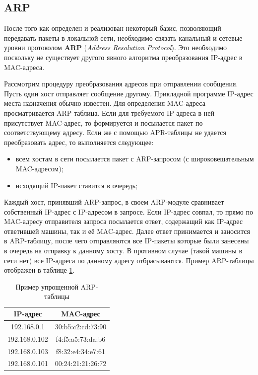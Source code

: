 {\small{}}

\subsection{ARP}

После того как определен и реализован некоторый базис, позволяющий передавать пакеты в локальной сети, необходимо связать канальный и сетевые уровни протоколом \textbf{ARP} (\textit{Address Resolution Protocol})\cite{arp}. Это необходимо поскольку не существует другого явного алгоритма преобразования IP-адрес в MAC-адреса\cite{arpcitforum}.

Рассмотрим процедуру преобразования адресов при отправлении сообщения. Пусть один хост отправляет сообщение другому. Прикладной программе IP-адрес места назначения обычно известен. Для определения MAC-адреса просматривается ARP-таблица. Если для требуемого IP-адреса в ней присутствует MAC-адрес, то формируется и посылается пакет по соответствующему адресу. Если же с помощью APR-таблицы не удается преобразовать адрес, то выполняется следующее:
\begin{itemize}
	\item всем хостам в сети посылается пакет с ARP-запросом (с широковещательным MAC-адресом);
	\item исходящий IP-пакет ставится в очередь;
\end{itemize}

Каждый хост, принявший ARP-запрос, в своем ARP-модуле сравнивает собственный IP-адрес с IP-адресом в запросе. Если IP-адрес совпал, то прямо по MAC-адресу отправителя запроса посылается ответ, содержащий как IP-адрес ответившей машины, так и её MAC-адрес. Далее ответ принимается и заносится в ARP-таблицу, после чего отправляются все IP-пакеты которые были занесены в очередь на отправку к данному хосту. В противном случае (такой машины в сети нет) все IP-адреса по данному адресу отбрасываются. Пример ARP-таблицы отображен в таблице \ref{arptable}.

\begin{table}[h!]
\caption{Пример упрощенной ARP-таблицы}
\label{arptable}
	\begin{tabular}{|c|c|}
	\hline
	IP-адрес & MAC-адрес\\
	\hline
	192.168.0.1 & 30:b5:c2:cd:73:90 \\
	\hline
	192.168.0.102 & f4:f5:a5:73:da:b6 \\
	\hline
	192.168.0.103 & f8:32:e4:34:e7:61 \\
	\hline
	192.168.0.101 & 00:24:21:21:26:72 \\
	\hline
	\end{tabular}
\end{table}

